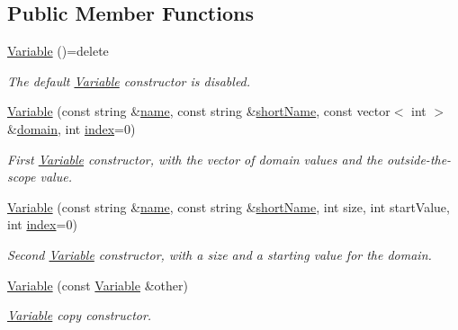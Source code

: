 \subsection*{Public Member Functions}
\begin{DoxyCompactItemize}
\item 
\hyperlink{classghost_1_1Variable_a41d27734b85f60c2e5fda7ee0ab5c600}{Variable} ()=delete
\begin{DoxyCompactList}\small\item\em The default \hyperlink{classghost_1_1Variable}{Variable} constructor is disabled. \end{DoxyCompactList}\item 
\hyperlink{classghost_1_1Variable_aa5dc881b8a239206bf55d018cc4a2156}{Variable} (const string \&\hyperlink{classghost_1_1Variable_a05cf4a4cd3a5c033028e0b0f11d1dafd}{name}, const string \&\hyperlink{classghost_1_1Variable_afb5eb79a7f6351b4305fe082699b6d7d}{short\+Name}, const vector$<$ int $>$ \&\hyperlink{classghost_1_1Variable_ab3d7bfa2e8c2139473775a6b797d0991}{domain}, int \hyperlink{classghost_1_1Variable_a934efa463fb1897b4266040e321dbc41}{index}=0)
\begin{DoxyCompactList}\small\item\em First \hyperlink{classghost_1_1Variable}{Variable} constructor, with the vector of domain values and the outside-\/the-\/scope value. \end{DoxyCompactList}\item 
\hyperlink{classghost_1_1Variable_a98be1149bd927b36a7914756641d6196}{Variable} (const string \&\hyperlink{classghost_1_1Variable_a05cf4a4cd3a5c033028e0b0f11d1dafd}{name}, const string \&\hyperlink{classghost_1_1Variable_afb5eb79a7f6351b4305fe082699b6d7d}{short\+Name}, int size, int start\+Value, int \hyperlink{classghost_1_1Variable_a934efa463fb1897b4266040e321dbc41}{index}=0)
\begin{DoxyCompactList}\small\item\em Second \hyperlink{classghost_1_1Variable}{Variable} constructor, with a size and a starting value for the domain. \end{DoxyCompactList}\item 
\hyperlink{classghost_1_1Variable_ac9fb0513e1d15a047816821e034589ea}{Variable} (const \hyperlink{classghost_1_1Variable}{Variable} \&other)
\begin{DoxyCompactList}\small\item\em \hyperlink{classghost_1_1Variable}{Variable} copy constructor. \end{DoxyCompactList}\item 

\end{DoxyCompactItemize}
